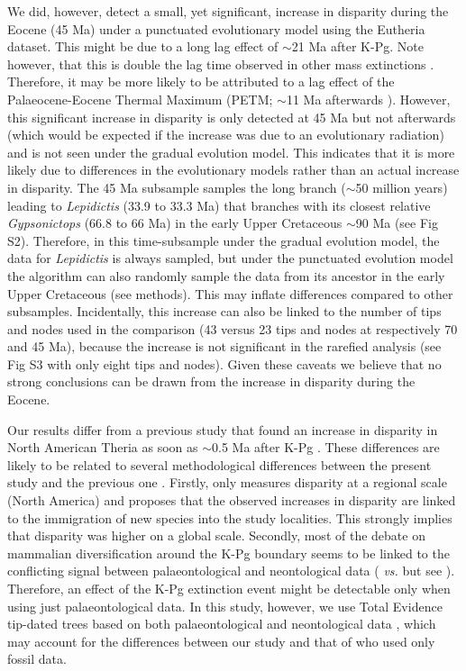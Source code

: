 \documentclass[12pt,letterpaper]{article}
\begin{document}
We did, however, detect a small, yet significant, increase in disparity during the Eocene (45 Ma) under a punctuated evolutionary model using the Eutheria dataset.
This might be due to a long lag effect of $\sim$21 Ma after K-Pg.
Note however, that this is double the lag time observed in other mass extinctions \cite{chen2012timing}.
Therefore, it may be more likely to be attributed to a lag effect of the Palaeocene-Eocene Thermal Maximum (PETM; $\sim$11 Ma afterwards \cite{bininda2007delayed}).
However, this significant increase in disparity is only detected at 45 Ma but not afterwards (which would be expected if the increase was due to an evolutionary radiation) and is not seen under the gradual evolution model.
This indicates that it is more likely due to differences in the evolutionary models rather than an actual increase in disparity.
The 45 Ma subsample samples the long branch ($\sim$50 million years) leading to \textit{Lepidictis} (33.9 to 33.3 Ma) that branches with its closest relative \textit{Gypsonictops} (66.8 to 66 Ma) in the early Upper Cretaceous $\sim$90 Ma (see Fig S2).
Therefore, in this time-subsample under the gradual evolution model, the data for \textit{Lepidictis} is always sampled, but under the punctuated evolution model the algorithm can also randomly sample the data from its ancestor in the early Upper Cretaceous (see methods).
This may inflate differences compared to other subsamples.
Incidentally, this increase can also be linked to the number of tips and nodes used in the comparison (43 versus 23 tips and nodes at respectively 70 and 45 Ma), because the increase is not significant in the rarefied analysis (see Fig S3 with only eight tips and nodes).
Given these caveats we believe that no strong conclusions can be drawn from the increase in disparity during the Eocene.

Our results differ from a previous study that found an increase in disparity in North American Theria as soon as $\sim$0.5 Ma after K-Pg \cite{Wilson2013}.
These differences are likely to be related to several methodological differences between the present study and the previous one \cite{Wilson2013}.
Firstly, \cite{Wilson2013} only measures disparity at a regional scale (North America) and proposes that the observed increases in disparity are linked to the immigration of new species into the study localities.
This strongly implies that disparity was higher on a global scale.
Secondly, most of the debate on mammalian diversification around the K-Pg boundary seems to be linked to the conflicting signal between palaeontological and neontological data (\cite{meredithimpacts2011} \textit{vs.} \cite{OLeary08022013} but see \cite{dosReis2014}).
Therefore, an effect of the K-Pg extinction event might be detectable only when using just palaeontological data.
In this study, however, we use Total Evidence tip-dated trees based on both palaeontological and neontological data \cite{Slater2012MEE,beckancient2014}, which may account for the differences between our study and that of \cite{Wilson2013} who used only fossil data.
\end{document}
